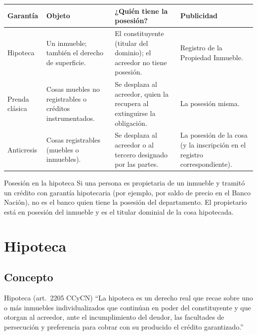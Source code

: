 \documentclass[12pt,oneside]{book}
\begin{document}
\begin{table}[H]
\centering
\begin{tabularx}{\textwidth}{@{}>{\raggedright\arraybackslash}p{}>{\raggedright\arraybackslash}X>{\raggedright\arraybackslash}X>{\raggedright\arraybackslash}p{}@{}}
\toprule
\textbf{Garantía} & \textbf{Objeto} & \textbf{¿Quién tiene la posesión?} & \textbf{Publicidad} \\
\midrule
Hipoteca & Un inmueble; también el derecho de superficie. & El constituyente (titular del dominio); el acreedor no tiene posesión. & Registro de la Propiedad Inmueble. \\
Prenda clásica & Cosas muebles no registrables o créditos instrumentados. & Se desplaza al acreedor, quien la recupera al extinguirse la obligación. & La posesión misma. \\
Anticresis & Cosas registrables (muebles o inmuebles). & Se desplaza al acreedor o al tercero designado por las partes. & La posesión de la cosa (y la inscripción en el registro correspondiente). \\
\bottomrule
\end{tabularx}
\end{table}

\begin{ejemplo}{Posesión en la hipoteca}
Si una persona es propietaria de un inmueble y tramitó un crédito con garantía hipotecaria (por ejemplo, por saldo de precio en el Banco Nación), no es el banco quien tiene la posesión del departamento. El propietario está en posesión del inmueble y es el titular dominial de la cosa hipotecada.
\end{ejemplo}

\section{Hipoteca}

\subsection{Concepto}

\begin{definicion}{Hipoteca (art.~2205 CCyCN)}
``La hipoteca es un derecho real que recae sobre uno o más inmuebles individualizados que continúan en poder del constituyente y que otorgan al acreedor, ante el incumplimiento del deudor, las facultades de persecución y preferencia para cobrar con su producido el crédito garantizado.''
\end{definicion}
\end{document}
